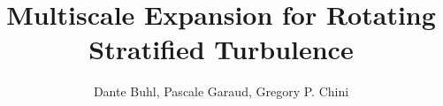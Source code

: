 \documentclass{article}
\begin{document}
\title{Multiscale Expansion for Rotating Stratified Turbulence}
\author{Dante Buhl, Pascale Garaud, Gregory P. Chini}


\newcommand{\wrms}{w_{\text{rms}}}
\newcommand{\bs}[1]{\boldsymbol{#1}}
\newcommand{\tb}[1]{\textbf{#1}}
\newcommand{\bmp}[1]{\begin{minipage}{#1\textwidth}}
\newcommand{\emp}{\end{minipage}}
\newcommand{\R}{\mathbb{R}}
\newcommand{\C}{\mathbb{C}}
\newcommand{\N}{\mathcal{N}}
\newcommand{\m}{\bs{\mu}_*}
\newcommand{\s}{\bs{\Sigma}_*}
\newcommand{\dt}{\Delta t}
\newcommand{\dx}{\Delta x}
\newcommand{\tr}[1]{\text{Tr}(#1)}
\newcommand{\Tr}[1]{\text{Tr}(#1)}
\newcommand{\Div}{\nabla \cdot}
\renewcommand{\div}{\nabla \cdot}
\newcommand{\Curl}{\nabla \times}
\newcommand{\Grad}{\nabla}
\newcommand{\grad}{\nabla}
\newcommand{\gradhs}{\nabla_{\perp S}}
\newcommand{\gradhf}{\nabla_{\perp F}}
\newcommand{\grads}{\nabla_s}
\newcommand{\gradf}{\nabla_f}
\newcommand{\xs}{x_s}
\newcommand{\x}{\bs{x}}
\newcommand{\xf}{x_f}
\newcommand{\ts}{t_s}
\newcommand{\tf}{t_f}
\newcommand{\pt}{\partial t}
\newcommand{\pz}{\partial z}
\newcommand{\uvec}{\bs{u}}
\newcommand{\uvecp}{\bs{u}_{\perp}}
\newcommand{\bvec}{\bs{B}}
\newcommand{\nvec}{\hat{\bs{n}}}
\newcommand{\tu}{\tilde{\uvec}}
\newcommand{\B}{\bs{B}}
\newcommand{\A}{\bs{A}}
\newcommand{\jvec}{\bs{j}}
\newcommand{\bracket}[1]{\left<#1\right>}
\newcommand{\F}{\bs{F}}
\newcommand{\T}{\tilde{T}}
\newcommand{\ez}{\bs{e}_z}
\newcommand{\ex}{\bs{e}_x}
\newcommand{\ey}{\bs{e}_y}
\newcommand{\eo}{\bs{e}_{\bs{\Omega}}}
\newcommand{\ppt}[1]{\frac{\partial #1}{\partial t}}
\newcommand{\pp}[2]{\frac{\partial #1}{\partial #2}}
\newcommand{\pptwo}[2]{\frac{\partial^2 #1}{\partial #2^2}}
\newcommand{\ddtwo}[2]{\frac{d^2 #1}{d #2^2}}
\newcommand{\DDt}[1]{\frac{D #1}{D t}}
\newcommand{\ppts}[1]{\frac{\partial #1}{\partial t_s}}
\newcommand{\pptf}[1]{\frac{\partial #1}{\partial t_f}}
\newcommand{\ppz}[1]{\frac{\partial #1}{\partial z}}
\newcommand{\ddz}[1]{\frac{d #1}{d z}}
\newcommand{\ppzetas}[1]{\frac{\partial^2 #1}{\partial \zeta^2}}
\newcommand{\ppzs}[1]{\frac{\partial #1}{\partial z_s}}
\newcommand{\ppzf}[1]{\frac{\partial #1}{\partial z_f}}
\newcommand{\ppx}[1]{\frac{\partial #1}{\partial x}}
\newcommand{\ddx}[1]{\frac{d #1}{d x}}
\newcommand{\ppxi}[1]{\frac{\partial #1}{\partial x_i}}
\newcommand{\ppxj}[1]{\frac{\partial #1}{\partial x_j}}
\newcommand{\ppy}[1]{\frac{\partial #1}{\partial y}}
\newcommand{\ppzeta}[1]{\frac{\partial #1}{\partial \zeta}}
\renewcommand{\k}{\bs{k}}
\newcommand{\real}[1]{\text{Re}\left[#1\right]}
\newcommand{\bexp}{\left(\bracket{b} + \bar{b} + b'\right)}
\newcommand{\upexp}{\left(\bracket{\uvec_{\perp}} + \bar{\uvec}_{\perp} + \uvec'_{\perp}\right)}
\newcommand{\wexp}{\left(\bracket{w} + \bar{w} + w'\right)}
\newcommand{\pexp}{\left(\bracket{p} + \bar{p} + p'\right)}
\end{document}

